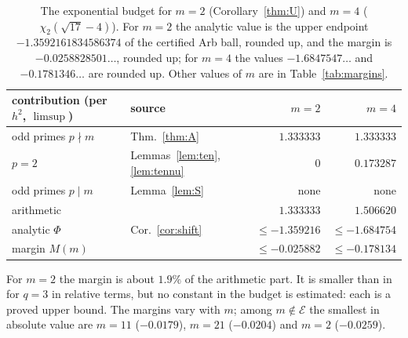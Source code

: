 \documentclass[11pt]{amsart}
\theoremstyle{definition}
\theoremstyle{remark}
\numberwithin{equation}{section}
\newcommand{\cE}{\mathcal{E}}
\begin{document}
\begin{table}[ht]
\centering\small
\begin{tabular}{@{}llrr@{}}
\toprule
contribution (per $h^2$, $\limsup$) & source & $m=2$ & $m=4$\\
\midrule
odd primes $p\nmid m$ & Thm.~\ref{thm:A} & $1.333333$ & $1.333333$\\
$p=2$ & Lemmas~\ref{lem:ten}, \ref{lem:tennu} & $0$ & $0.173287$\\
odd primes $p\mid m$ & Lemma~\ref{lem:S} & none & none\\
\midrule
arithmetic & & $1.333333$ & $1.506620$\\
analytic $\Phi$ & Cor.~\ref{cor:shift} & $\le-1.359216$ & $\le-1.684754$\\
\midrule
margin $M(m)$ & & $\le-0.025882$ & $\le-0.178134$\\
\bottomrule
\end{tabular}
\caption{The exponential budget for $m=2$ (Corollary~\ref{thm:U}) and $m=4$ ($\chi_2(\sqrt{17}-4)$). For $m=2$ the
analytic value is the upper endpoint $-1.3592161834586374$ of the certified Arb ball, rounded up, and the margin is
$-0.0258828501\ldots$, rounded up; for $m=4$ the values $-1.6847547\ldots$ and $-0.1781346\ldots$ are rounded up. Other values of $m$ are in Table~\ref{tab:margins}.}\label{tab:budget}
\end{table}

For $m=2$ the margin is about $1.9\%$ of the arithmetic part. It is smaller than in \cite{Chi2Paper} for $q=3$ in
relative terms, but no constant in the budget is estimated: each is a proved upper bound. The margins vary with $m$; among
$m\notin\cE$ the smallest in absolute value are $m=11$ ($-0.0179$), $m=21$ ($-0.0204$) and $m=2$ ($-0.0259$).
\end{document}
